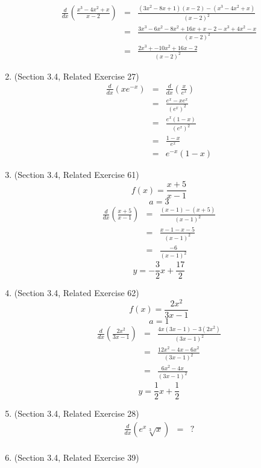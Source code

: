 \documentclass{article}
\begin{document}
\begin{enumerate}
\begin{eqnarray}
            \frac{d}{dx}\left(\frac{x^3-4x^2+x}{x-2}\right) &=& \frac{(3x^2 - 8x + 1)(x-2) - (x^3 - 4x^2 + x)}{(x-2)^2} \\
            &=& \frac{3x^3 - 6x^2 - 8x^2 + 16x + x - 2 - x^3 + 4x^2 - x}{(x-2)^2} \\
            &=& \frac{2x^3 + -10x^2 + 16x - 2}{(x-2)^2}
        \end{eqnarray}
    \item (Section 3.4, Related Exercise 27)
        \begin{eqnarray}
            \frac{d}{dx}\left(xe^{-x}\right) &=& \frac{d}{dx}\left(\frac{x}{e^x}\right) \\
            &=& \frac{e^x - xe^x}{\left(e^x\right)^2} \\
            &=& \frac{e^x(1 - x)}{\left(e^x\right)^2} \\
            &=& \frac{1 - x}{e^x} \\
            &=& e^{-x}\left(1 - x\right)
        \end{eqnarray}
    \item (Section 3.4, Related Exercise 61)
        $$f(x) = \frac{x + 5}{x - 1}$$
        $$a = 3$$
        \begin{eqnarray}
            \frac{d}{dx}\left(\frac{x+5}{x-1}\right) &=& \frac{(x-1) - (x+5)}{(x-1)^2} \\
            &=& \frac{x - 1 - x - 5}{(x-1)^2} \\
            &=& \frac{- 6}{(x-1)^2}
        \end{eqnarray}
        $$y = - \frac{3}{2}x + \frac{17}{2}$$
    \item (Section 3.4, Related Exercise 62)
        $$f(x) = \frac{2x^2}{3x - 1}$$
        $$a = 1$$
        \begin{eqnarray}
            \frac{d}{dx}\left(\frac{2x^2}{3x - 1}\right) &=& \frac{4x(3x - 1) - 3(2x^2)}{(3x - 1)^2} \\
            &=& \frac{12x^2 - 4x - 6x^2}{(3x - 1)^2} \\
            &=& \frac{6x^2 - 4x}{(3x - 1)^2}
        \end{eqnarray}
        $$y = \frac{1}{2}x + \frac{1}{2}$$
    \item (Section 3.4, Related Exercise 28)
        \begin{eqnarray}
            \frac{d}{dx}\left(e^x \sqrt[3]{x}\right) &=& ? \\
        \end{eqnarray}
    \item (Section 3.4, Related Exercise 39)

\end{enumerate}
\end{document}
